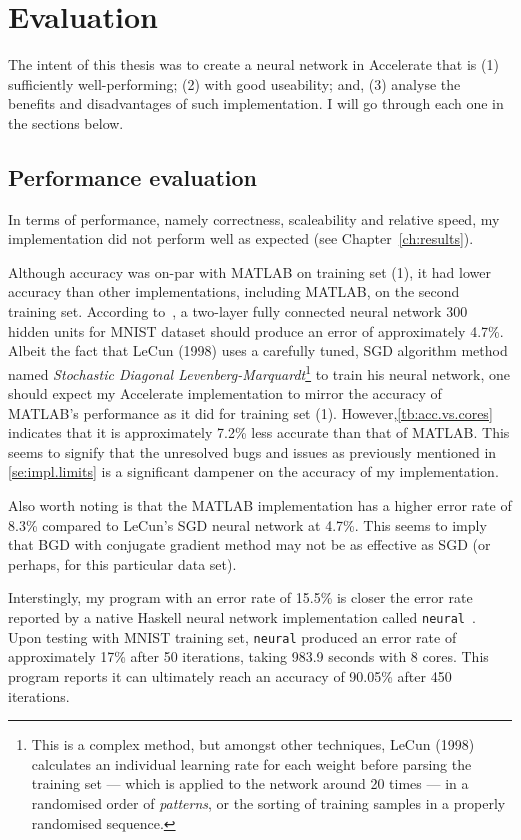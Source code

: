 \chapter{Evaluation}\label{ch:eval}

The intent of this thesis was to create a neural network in Accelerate that is (1) sufficiently well-performing; (2) with good useability; and, (3) analyse the benefits and disadvantages of such implementation. I will go through each one in the sections below.

\section{Performance evaluation} \label{se:eval.performance}

In terms of performance, namely correctness, scaleability and relative speed, my implementation did not perform well as expected (see Chapter~\ref{ch:results}).

Although accuracy was on-par with MATLAB on training set (1), it had lower accuracy than other implementations, including MATLAB, on the second training set. According to~\cite{LeC98}, a two-layer fully connected neural network 300 hidden units for MNIST dataset should produce an error of approximately 4.7\%. Albeit the fact that LeCun (1998) uses a carefully tuned, SGD algorithm method named \textit{Stochastic Diagonal Levenberg-Marquardt}\footnote{This is a complex method, but amongst other techniques, LeCun (1998) calculates an individual learning rate for each weight before parsing the training set --- which is applied to the network around 20 times --- in a randomised order of \textit{patterns}, or the sorting of training samples in a properly randomised sequence.} to train his neural network, one should expect my Accelerate implementation to mirror the accuracy of MATLAB's performance as it did for training set (1). However,\ref{tb:acc.vs.cores} indicates that it is approximately 7.2\% less accurate than that of MATLAB. This seems to signify that the unresolved bugs and issues as previously mentioned in \ref{se:impl.limits} is a significant dampener on the accuracy of my implementation.

Also worth noting is that the MATLAB implementation has a higher error rate of 8.3\% compared to LeCun's SGD neural network at 4.7\%. This seems to imply that BGD with conjugate gradient method may not be as effective as SGD (or perhaps, for this particular data set). 

Interstingly, my program with an error rate of 15.5\% is closer the error rate reported by a native Haskell neural network implementation called \texttt{neural}~\cite{Bru16}. Upon testing with MNIST training set, \texttt{neural} produced an error rate of approximately 17\% after 50 iterations, taking 983.9 seconds with 8 cores. This program reports it can ultimately reach an accuracy of 90.05\% after 450 iterations. 


